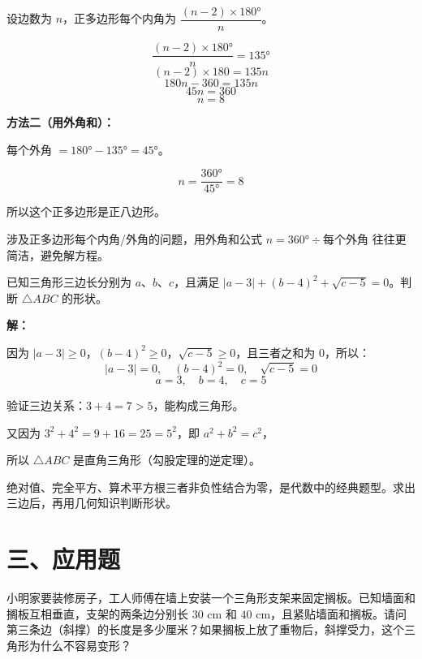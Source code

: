 \documentclass[12pt, a4paper]{ctexart}
\begin{document}
设边数为 $n$，正多边形每个内角为 $\dfrac{(n-2) \times 180°}{n}$。

\[
\frac{(n-2) \times 180°}{n} = 135°
\]
\[
(n-2) \times 180 = 135n
\]
\[
180n - 360 = 135n
\]
\[
45n = 360
\]
\[
n = 8
\]

\textbf{方法二（用外角和）：}

每个外角 $= 180° - 135° = 45°$。

\[
n = \frac{360°}{45°} = 8
\]

所以这个正多边形是正八边形。

\begin{tipbox}[方法总结]
涉及正多边形每个内角/外角的问题，用外角和公式 $n = 360° \div \text{每个外角}$ 往往更简洁，避免解方程。
\end{tipbox}

\begin{examplebox}[【例题7】与代数交叉的综合题]
已知三角形三边长分别为 $a$、$b$、$c$，且满足 $|a - 3| + (b - 4)^2 + \sqrt{c - 5} = 0$。判断 $\triangle ABC$ 的形状。
\end{examplebox}

\textbf{解：}

因为 $|a - 3| \geqslant 0$，$(b - 4)^2 \geqslant 0$，$\sqrt{c - 5} \geqslant 0$，且三者之和为 $0$，所以：
\[
|a - 3| = 0, \quad (b - 4)^2 = 0, \quad \sqrt{c - 5} = 0
\]
\[
a = 3, \quad b = 4, \quad c = 5
\]

验证三边关系：$3 + 4 = 7 > 5$，能构成三角形。

又因为 $3^2 + 4^2 = 9 + 16 = 25 = 5^2$，即 $a^2 + b^2 = c^2$，

所以 $\triangle ABC$ 是直角三角形（勾股定理的逆定理）。

\begin{tipbox}[方法总结]
绝对值、完全平方、算术平方根三者非负性结合为零，是代数中的经典题型。求出三边后，再用几何知识判断形状。
\end{tipbox}

\section*{\textcolor{apppurple}{三、应用题}}

\begin{appbox}[【应用1】建筑中的三角形稳定性]
小明家要装修房子，工人师傅在墙上安装一个三角形支架来固定搁板。已知墙面和搁板互相垂直，支架的两条边分别长 $30\text{ cm}$ 和 $40\text{ cm}$，且紧贴墙面和搁板。请问第三条边（斜撑）的长度是多少厘米？如果搁板上放了重物后，斜撑受力，这个三角形为什么不容易变形？
\end{appbox}
\end{document}
